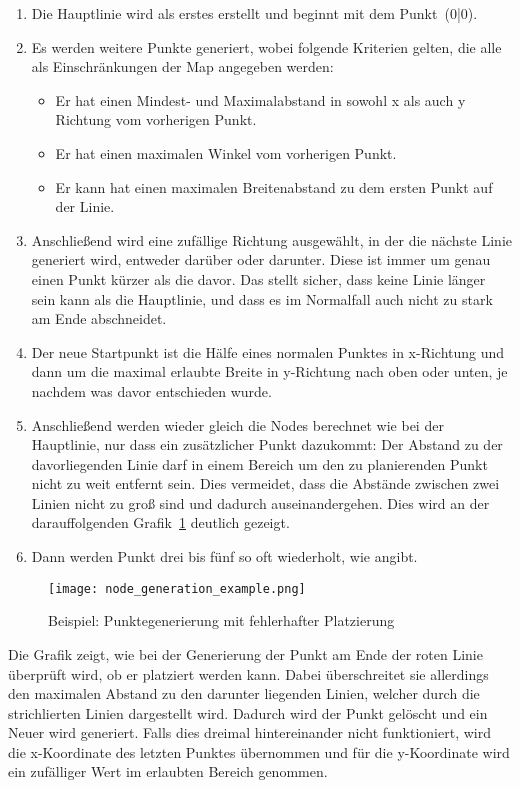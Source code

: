 \begin{enumerate}
    \item Die Hauptlinie wird als erstes erstellt und beginnt mit dem Punkt~(0|0).
    \item Es werden  weitere Punkte generiert, wobei folgende Kriterien gelten, die alle als Einschränkungen der Map angegeben werden:
    \begin{itemize}
        \item Er hat einen Mindest- und Maximalabstand in sowohl x als auch y Richtung vom vorherigen Punkt.
        \item Er hat einen maximalen Winkel vom vorherigen Punkt.
        \item Er kann hat einen maximalen Breitenabstand zu dem ersten Punkt auf der Linie.
    \end{itemize}
    \item Anschließend wird eine zufällige Richtung ausgewählt, in der die nächste Linie generiert wird, entweder darüber oder darunter.
    Diese ist immer um genau einen Punkt kürzer als die davor.
    Das stellt sicher, dass keine Linie länger sein kann als die Hauptlinie, und dass es im Normalfall auch nicht zu stark am Ende abschneidet.
    \item Der neue Startpunkt ist die Hälfe eines normalen Punktes in x-Richtung und dann um die maximal erlaubte Breite in y-Richtung nach oben oder unten, je nachdem was davor entschieden wurde.
    \item Anschließend werden wieder gleich die Nodes berechnet wie bei der Hauptlinie, nur dass ein zusätzlicher Punkt dazukommt:
    Der Abstand zu der davorliegenden Linie darf in einem Bereich um den zu planierenden Punkt nicht zu weit entfernt sein.
    Dies vermeidet, dass die Abstände zwischen zwei Linien nicht zu groß sind und dadurch auseinandergehen.
    Dies wird an der darauffolgenden Grafik~\ref{fig:point-generation} deutlich gezeigt.
    \item Dann werden Punkt drei bis fünf so oft wiederholt, wie  angibt.
\end{enumerate}

\begin{figure}[H]
    \centering
    \texttt{[image: node\_generation\_example.png]}
    \caption{Beispiel: Punktegenerierung mit fehlerhafter Platzierung}\label{fig:point-generation}
\end{figure}
Die Grafik zeigt, wie bei der Generierung der Punkt am Ende der roten Linie überprüft wird, ob er platziert werden kann.
Dabei überschreitet sie allerdings den maximalen Abstand zu den darunter liegenden Linien, welcher durch die strichlierten Linien dargestellt wird.
Dadurch wird der Punkt gelöscht und ein Neuer wird generiert.
Falls dies dreimal hintereinander nicht funktioniert, wird die x-Koordinate des letzten Punktes übernommen und für die y-Koordinate wird ein zufälliger Wert im erlaubten Bereich genommen.


